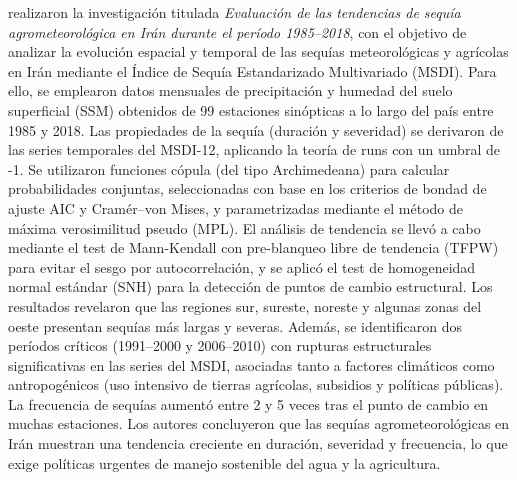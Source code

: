 \textcite{Isfahani2022} realizaron la investigación titulada \emph{Evaluación de las tendencias de sequía agrometeorológica en Irán durante el período 1985–2018}, con el objetivo de analizar la evolución espacial y temporal de las sequías meteorológicas y agrícolas en Irán mediante el Índice de Sequía Estandarizado Multivariado (MSDI). Para ello, se emplearon datos mensuales de precipitación y humedad del suelo superficial (SSM) obtenidos de 99 estaciones sinópticas a lo largo del país entre 1985 y 2018. Las propiedades de la sequía (duración y severidad) se derivaron de las series temporales del MSDI-12, aplicando la teoría de runs con un umbral de -1. Se utilizaron funciones cópula (del tipo Archimedeana) para calcular probabilidades conjuntas, seleccionadas con base en los criterios de bondad de ajuste AIC y Cramér–von Mises, y parametrizadas mediante el método de máxima verosimilitud pseudo (MPL). El análisis de tendencia se llevó a cabo mediante el test de Mann-Kendall con pre-blanqueo libre de tendencia (TFPW) para evitar el sesgo por autocorrelación, y se aplicó el test de homogeneidad normal estándar (SNH) para la detección de puntos de cambio estructural. Los resultados revelaron que las regiones sur, sureste, noreste y algunas zonas del oeste presentan sequías más largas y severas. Además, se identificaron dos períodos críticos (1991–2000 y 2006–2010) con rupturas estructurales significativas en las series del MSDI, asociadas tanto a factores climáticos como antropogénicos (uso intensivo de tierras agrícolas, subsidios y políticas públicas). La frecuencia de sequías aumentó entre 2 y 5 veces tras el punto de cambio en muchas estaciones. Los autores concluyeron que las sequías agrometeorológicas en Irán muestran una tendencia creciente en duración, severidad y frecuencia, lo que exige políticas urgentes de manejo sostenible del agua y la agricultura.

